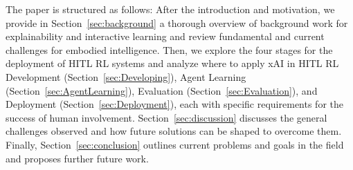 \documentclass[twoside,11pt]{article}
\begin{document}
The paper is structured as follows: After the introduction and motivation, we provide in Section~\ref{sec:background} a thorough overview of background work for explainability and interactive learning and review fundamental and current challenges for embodied intelligence. Then, we explore the four stages for the deployment of HITL RL systems and analyze where to apply xAI in HITL RL Development (Section~\ref{sec:Developing}), Agent Learning (Section~\ref{sec:AgentLearning}), Evaluation (Section~\ref{sec:Evaluation}), and Deployment (Section~\ref{sec:Deployment}), each with specific requirements for the success of human involvement. Section~\ref{sec:discussion} discusses the general challenges observed and how future solutions can be shaped to overcome them. Finally, Section~\ref{sec:conclusion} outlines current problems and goals in the field and proposes further future work.
\end{document}

